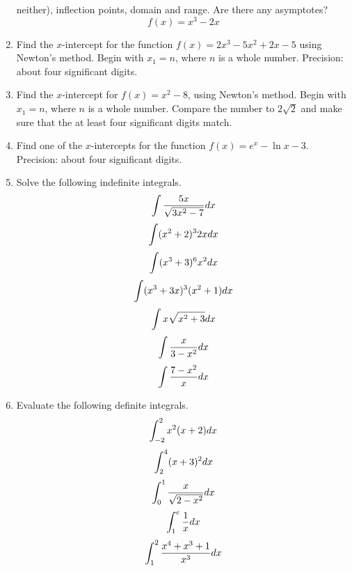 \documentclass[11pt]{article}
\begin{document}
\begin{enumerate}
  neither), inflection points, domain and range. Are there any
  asymptotes? 
  \begin{equation}
    \label{eq:hiexaize}
    f(x)=x^{3}-2x
  \end{equation}
\item Find the $x$-intercept for the function $f(x)=2x^{3}-5x^{2}+2x-5$
using Newton's method. Begin with $x_{1}=n$, where $n$ is a whole
number. Precision: about four significant digits.
\item Find the $x$-intercept for $f(x)=x^{2}-8$, using Newton's method.
Begin with $x_{1}=n$, where $n$ is a whole number. Compare the number
to $2\sqrt{2}$ and make sure that the at least four significant digits
match.
\item Find one of the $x$-intercepts for the function
$f(x)=e^{x}-\ln{}x-3$. Precision: about four significant digits.
\item Solve the following indefinite integrals.
\begin{equation}
  \label{eq:uleinaig}
  \int\frac{5x}{\sqrt{3x^{2}-7}}dx \notag
\end{equation}
\begin{equation}
  \label{eq:teenaeta}
  \int(x^{2}+2)^{3}2xdx\notag
\end{equation}
\begin{equation}
  \label{eq:eexinuli}
  \int(x^{3}+3)^{6}x^{2}dx\notag
\end{equation}
\begin{equation}
  \label{eq:eipheico}
  \int(x^{3}+3x)^{3}(x^{2}+1)dx\notag
\end{equation}
\begin{equation}
  \label{eq:neebazek}
  \int{}x\sqrt{x^{2}+3}dx\notag
\end{equation}
\begin{equation}
  \label{eq:ohfohbee}
  \int\frac{x}{3-x^{2}}dx\notag
\end{equation}
\begin{equation}
  \label{eq:aawozoog}
  \int{}\frac{7-x^{2}}{x}dx\notag
\end{equation}
\item Evaluate the following definite integrals.
\begin{equation}
  \label{eq:aethaeng}
  \int_{-2}^{2}x^{2}(x+2)dx\notag
\end{equation}
\begin{equation}
  \label{eq:eangekuu}
  \int_{2}^{4}(x+3)^{2}dx\notag
\end{equation}
\begin{equation}
  \label{eq:teighaqu}
  \int_{0}^{1}\frac{x}{\sqrt{2-x^{2}}}dx\notag
\end{equation}
\begin{equation}
  \label{eq:pohkeiza}
  \int_{1}^{e}\frac{1}{x}dx\notag
\end{equation}
\begin{equation}
  \label{eq:ohgahjah}
  \int_{1}^{2}\frac{x^{4}+x^{3}+1}{x^{3}}dx\notag
\end{equation}
\end{enumerate}
\end{document}
